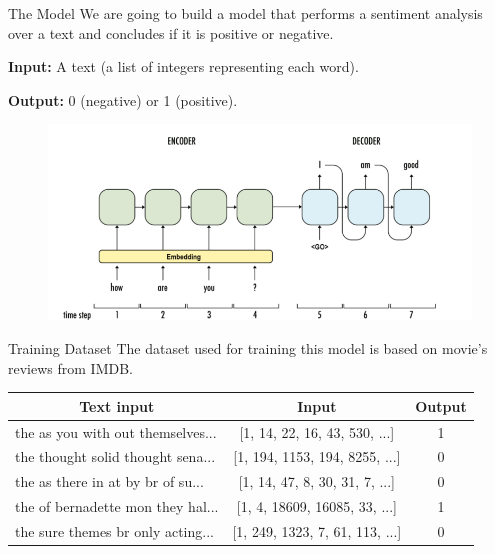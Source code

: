 \begin{frame}{The Model}
    We are going to build a model that performs a sentiment analysis over a text and concludes if it is positive or negative.

    \textbf{Input:} A text (a list of integers representing each word).

    \textbf{Output:} 0 (negative) or 1 (positive).

    \begin{figure}
        \includegraphics[width=\textwidth]{img/lstm-model.png}
    \end{figure}
\end{frame}

\begin{frame}{Training Dataset}
    The dataset used for training this model is based on movie's reviews from IMDB.

    \qquad

    \begin{tabular}{lcc}
        \toprule
        \multicolumn{1}{c}{\textbf{Text input}} & \textbf{Input} & \textbf{Output} \\
        \midrule
        the as you with out themselves... & [1, 14, 22, 16, 43, 530, ...] & 1 \\
        the thought solid thought sena... & [1, 194, 1153, 194, 8255, ...] & 0 \\
        the as there in at by br of su... & [1, 14, 47, 8, 30, 31, 7, ...] & 0 \\
        the of bernadette mon they hal... & [1, 4, 18609, 16085, 33, ...] & 1 \\
        the sure themes br only acting... & [1, 249, 1323, 7, 61, 113, ...] & 0 \\
        \bottomrule
    \end{tabular}
\end{frame}
